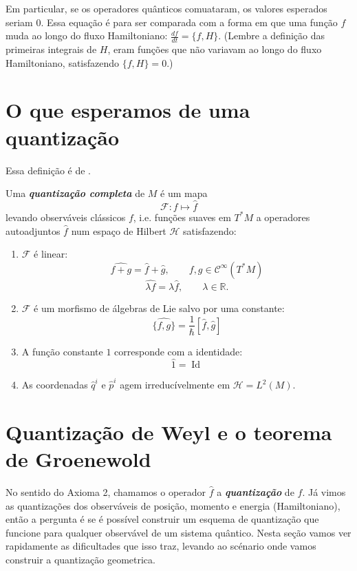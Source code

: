 Em particular, se os operadores quânticos comuataram, os valores esperados seriam 0. Essa equação é para ser comparada com a forma em que uma função $f$ muda ao longo do fluxo Hamiltoniano: $\frac{df}{dt}=\{f,H\}$. (Lembre a definição das primeiras integrais de $H$, eram funções que não variavam ao longo do fluxo Hamiltoniano, satisfazendo $\{f,H\}=0$.)

\section{O que esperamos de uma quantização}

Essa definição é de \cite{k3quant}.
\begin{defn}\leavevmode
	Uma \textit{\textbf{quantização completa}} de $M$ é um mapa
	\[\mathcal{F}:f\longmapsto \hat{f}\]
	levando observáveis clássicos $f $, i.e. funções suaves em $T^*M$ a operadores autoadjuntos $\hat{f}$ num espaço de Hilbert $\mathcal{H}$ satisfazendo:
	\begin{enumerate}
		\item $\mathcal{F}$ é linear:
			\[\widehat{f+g}=\hat{f}+\hat{g},\qquad f,g\in\mathcal{C}^\infty(T^*M)\]
			\[\widehat{\lambda f}=\lambda\hat{f},\qquad \lambda\in\mathbb{R}.\]
	
		\item $ \mathcal{F}$ é um morfismo de álgebras de Lie salvo por uma constante:
			\[\widehat{\{f,g\}}=\frac{1}{\hslash}\left[\hat{f},\hat{g}\right]\]
\item A função constante $1$ corresponde com a identidade:
	\[\hat{1}=\operatorname{Id}\]

	\item As coordenadas $\hat{q}^i$ e $\hat{p}^i$ agem irreducívelmente em $\mathcal{H}=L^2(M)$.
	\end{enumerate}
\end{defn}

\section{Quantização de Weyl e o teorema de Groenewold}

No sentido do Axioma 2, chamamos o operador $\hat{f}$ a \textit{\textbf{quantização}} de $f$. Já vimos as quantizações dos observáveis de posição, momento e energia (Hamiltoniano), então a pergunta é se é possível construir um esquema de quantização que funcione para qualquer observável de um sistema quântico. Nesta seção vamos ver rapidamente as dificultades que isso traz, levando ao scénario onde vamos construir a quantização geometrica.

